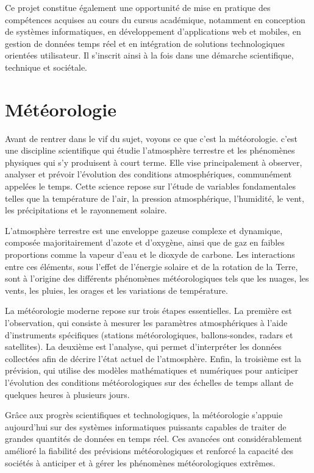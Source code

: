 Ce projet constitue également une opportunité de mise en pratique des compétences acquises au cours du cursus académique, notamment en conception de systèmes informatiques, en développement d’applications web et mobiles, en gestion de données temps réel et en intégration de solutions technologiques orientées utilisateur. Il s’inscrit ainsi à la fois dans une démarche scientifique, technique et sociétale.


\clearpage
\section{Météorologie}
Avant de rentrer dans le vif du sujet, voyons ce que c'est la météorologie. c'est une discipline scientifique qui étudie l’atmosphère terrestre et les phénomènes physiques qui s’y produisent à court terme. Elle vise principalement à observer, analyser et prévoir l’évolution des conditions atmosphériques, communément appelées le temps. Cette science repose sur l’étude de variables fondamentales telles que la température de l’air, la pression atmosphérique, l’humidité, le vent, les précipitations et le rayonnement solaire.

L’atmosphère terrestre est une enveloppe gazeuse complexe et dynamique, composée majoritairement d’azote et d’oxygène, ainsi que de gaz en faibles proportions comme la vapeur d’eau et le dioxyde de carbone. Les interactions entre ces éléments, sous l’effet de l’énergie solaire et de la rotation de la Terre, sont à l’origine des différents phénomènes météorologiques tels que les nuages, les vents, les pluies, les orages et les variations de température.

La météorologie moderne repose sur trois étapes essentielles.
La première est l’observation, qui consiste à mesurer les paramètres atmosphériques à l’aide d’instruments spécifiques (stations météorologiques, ballons-sondes, radars et satellites). La deuxième est l’analyse, qui permet d’interpréter les données collectées afin de décrire l’état actuel de l’atmosphère. Enfin, la troisième est la prévision, qui utilise des modèles mathématiques et numériques pour anticiper l’évolution des conditions météorologiques sur des échelles de temps allant de quelques heures à plusieurs jours.

Grâce aux progrès scientifiques et technologiques, la météorologie s’appuie aujourd’hui sur des systèmes informatiques puissants capables de traiter de grandes quantités de données en temps réel. Ces avancées ont considérablement amélioré la fiabilité des prévisions météorologiques et renforcé la capacité des sociétés à anticiper et à gérer les phénomènes météorologiques extrêmes.

